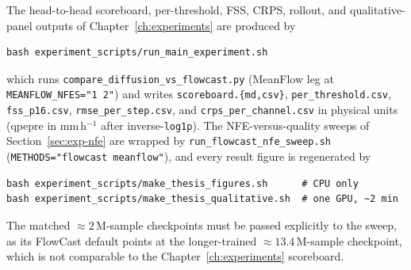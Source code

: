 The head-to-head scoreboard, per-threshold, FSS, CRPS, rollout, and qualitative-panel outputs of Chapter~\ref{ch:experiments} are produced by
\begin{verbatim}
bash experiment_scripts/run_main_experiment.sh
\end{verbatim}
which runs \texttt{compare\_diffusion\_vs\_flowcast.py} (MeanFlow leg at \texttt{MEANFLOW\_NFES="1 2"}) and writes \texttt{scoreboard.\{md,csv\}}, \texttt{per\_threshold.csv}, \texttt{fss\_p16.csv}, \texttt{rmse\_per\_step.csv}, and \texttt{crps\_per\_channel.csv} in physical units (qpepre in mm\,h$^{-1}$ after inverse-\texttt{log1p}). The NFE-versus-quality sweeps of Section~\ref{sec:exp-nfe} are wrapped by \texttt{run\_flowcast\_nfe\_sweep.sh} (\texttt{METHODS="flowcast meanflow"}), and every result figure is regenerated by
\begin{verbatim}
bash experiment_scripts/make_thesis_figures.sh      # CPU only
bash experiment_scripts/make_thesis_qualitative.sh  # one GPU, ~2 min
\end{verbatim}
The matched $\approx 2\,\text{M}$-sample checkpoints must be passed explicitly to the sweep, as its FlowCast default points at the longer-trained $\approx 13.4\,\text{M}$-sample checkpoint, which is not comparable to the Chapter~\ref{ch:experiments} scoreboard.
